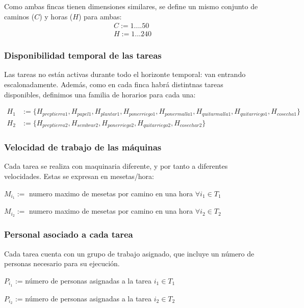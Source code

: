 Como ambas fincas tienen dimensiones similares, se define un mismo conjunto de caminos ($C$) y horas ($H$) para ambas:
    \[\begin{aligned}
        C:={1....50}\\
        H:={1...240}
    \end{aligned}\]

\subsubsection{Disponibilidad temporal de las tareas}

Las tareas no están activas durante todo el horizonte temporal: van entrando escalonadamente. 
Además, como en cada finca habrá distintnas tareas disponibles, definimos una familia de horarios para cada una:

\[\begin{aligned}
    H_1 &:= \{H_{preptierra1},H_{papel1},H_{plantar1},H_{ponerriego1},H_{ponermalla1},H_{quitarmalla1},H_{quitarriego1},H_{cosecha1}\}\\
    H_2 &:= \{H_{preptierra2},H_{sembrar2},H_{ponerriego2},H_{quitarriego2},H_{cosechar2}\}   
\end{aligned}\]    

\subsubsection{Velocidad de trabajo de las máquinas}

Cada tarea se realiza con maquinaria diferente, y por tanto a diferentes velocidades. Estas se expresan en mesetas/hora:
\begin{center}
$M_{i_1}:=$ numero maximo de mesetas por camino en una hora $\forall i_1 \in T_1$

$M_{i_2}:=$ numero maximo de mesetas por camino en una hora $\forall i_2 \in T_2$
\end{center}


\subsubsection{Personal asociado a cada tarea}
Cada tarea cuenta con un grupo de trabajo asignado, que incluye un número de personas necesario para su ejecución.
\begin{center}
    $P_{i_1}$ := número de personas asignadas a la tarea $i_1 \in T_1$

    $P_{i_2}$ := número de personas asignadas a la tarea $i_2 \in T_2$    
\end{center}

